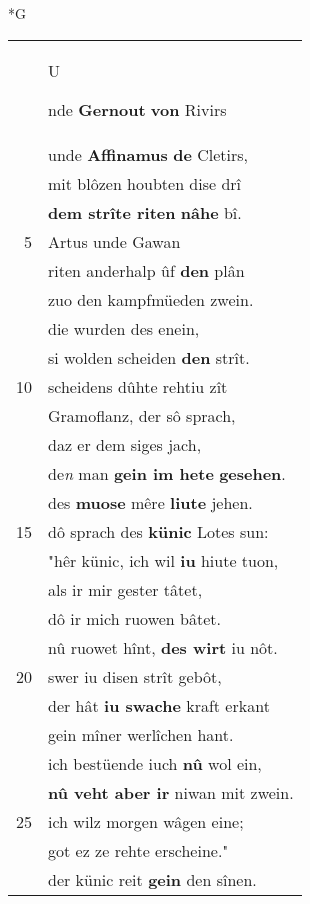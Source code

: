 \documentclass[8pt,a4paper,notitlepage]{article}
\begin{document}
\newpage
\begin{table}[ht]
\begin{minipage}[t]{0.5\linewidth}
\small
\begin{center}*G
\end{center}
\begin{tabular}{rl}
 & \begin{large}U\end{large}nde \textbf{Gernout} \textbf{von} Rivirs\\ 
 & unde \textbf{Affinamus} \textbf{de} Cletirs,\\ 
 & mit blôzen houbten dise drî\\ 
 & \textbf{dem strîte riten} \textbf{nâhe} bî.\\ 
5 & Artus unde Gawan\\ 
 & riten anderhalp ûf \textbf{den} plân\\ 
 & zuo den kampfmüeden zwein.\\ 
 & die wurden des enein,\\ 
 & si wolden scheiden \textbf{den} strît.\\ 
10 & scheidens dûhte rehtiu zît\\ 
 & Gramoflanz, der sô sprach,\\ 
 & daz er dem siges jach,\\ 
 & de\textit{n} man \textbf{gein im hete} \textbf{gesehen}.\\ 
 & des \textbf{muose} mêre \textbf{liute} jehen.\\ 
15 & dô sprach des \textbf{künic} Lotes sun:\\ 
 & "hêr künic, ich wil \textbf{iu} hiute tuon,\\ 
 & als ir mir gester tâtet,\\ 
 & dô ir mich ruowen bâtet.\\ 
 & nû ruowet hînt, \textbf{des wirt} iu nôt.\\ 
20 & swer iu disen strît gebôt,\\ 
 & der hât \textbf{iu swache} kraft erkant\\ 
 & gein mîner werlîchen hant.\\ 
 & ich bestüende iuch \textbf{nû} wol ein,\\ 
 & \textbf{nû veht aber ir} niwan mit zwein.\\ 
25 & ich wilz morgen wâgen eine;\\ 
 & got ez ze rehte erscheine."\\ 
 & der künic reit \textbf{gein} den sînen.\\ 

\end{tabular}
\end{minipage}
\end{table}
\end{document}
